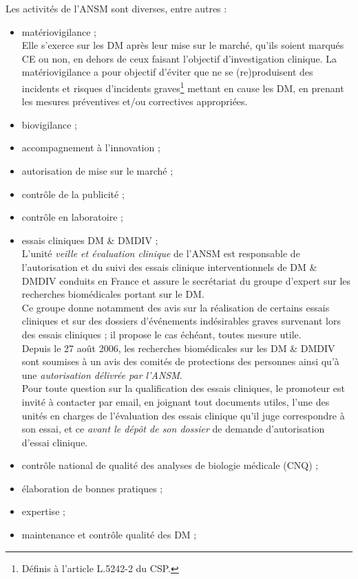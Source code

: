 \documentclass[a4paper,11pt]{article}
\newcounter{exe}
\begin{document}
\begin{sloppypar}
Les activités de l'ANSM sont diverses, entre autres :
\begin{itemize}
 \item matériovigilance ; \\
 Elle s'exerce sur les DM après leur mise sur le marché, qu'ils soient marqués CE ou non, en dehors de ceux faisant l'objectif d'investigation clinique. 
 La matériovigilance a pour objectif d'éviter que ne se (re)produisent des incidents et risques d'incidents graves\footnote{Définis à l'article L.5242-2 du CSP.} 
 mettant en cause les DM, en prenant les mesures préventives et/ou correctives appropriées. 
 \item biovigilance ;
 \item accompagnement à l'innovation ;
 \item autorisation de mise sur le marché ;
 \item contrôle de la publicité ;
 \item contrôle en laboratoire ;
 \item essais cliniques DM \& DMDIV ;\\
 L'unité \emph{veille et évaluation clinique} de l'ANSM est responsable de l'autorisation et du suivi des essais clinique interventionnels de DM \& DMDIV conduits en France
 et assure le secrétariat du groupe d'expert sur les recherches biomédicales portant sur le DM.\\
 Ce groupe donne notamment des avis sur la réalisation de certains essais cliniques et sur des dossiers d'événements indésirables graves survenant lors des essais cliniques
  ; il propose le cas échéant, toutes mesure utile.\\
  Depuis le 27 août 2006, les recherches biomédicales sur les DM \& DMDIV sont soumises à un avis des comités de protections des personnes ainsi qu'à une \emph{autorisation délivrée par l'ANSM}.\\
  Pour toute question sur la qualification des essais cliniques, le promoteur est invité à contacter par email, en joignant tout documents utiles, l'une des unités en charges
  de l'évaluation des essais clinique qu'il juge correspondre à son essai, et ce \emph{avant le dépôt de son dossier} de demande d'autorisation d'essai clinique.
 \item contrôle national de qualité des analyses de biologie médicale (CNQ) ;
 \item élaboration de bonnes pratiques ;
 \item expertise ;
 \item maintenance et contrôle qualité des DM ;\\

\end{itemize}
\end{sloppypar}
\end{document}
